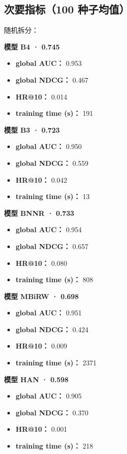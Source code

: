 \documentclass[
  10pt,
]{ctexart}
\providecommand{\tightlist}{%
  \setlength{\itemsep}{0pt}\setlength{\parskip}{0pt}}
\begin{document}
\subsection{次要指标（100
种子均值）}\label{ux6b21ux8981ux6307ux6807100-ux79cdux5b50ux5747ux503c}

随机拆分：

\textbf{模型 B4 · 0.745}

\begin{itemize}
\tightlist
\item
  \textbf{global AUC：} 0.953
\item
  \textbf{global NDCG：} 0.467
\item
  \textbf{HR@10：} 0.014
\item
  \textbf{training time (s)：} 191
\end{itemize}

\textbf{模型 B3 · 0.723}

\begin{itemize}
\tightlist
\item
  \textbf{global AUC：} 0.950
\item
  \textbf{global NDCG：} 0.559
\item
  \textbf{HR@10：} 0.042
\item
  \textbf{training time (s)：} 13
\end{itemize}

\textbf{模型 BNNR · 0.733}

\begin{itemize}
\tightlist
\item
  \textbf{global AUC：} 0.954
\item
  \textbf{global NDCG：} 0.657
\item
  \textbf{HR@10：} 0.080
\item
  \textbf{training time (s)：} 808
\end{itemize}

\textbf{模型 MBiRW · 0.698}

\begin{itemize}
\tightlist
\item
  \textbf{global AUC：} 0.951
\item
  \textbf{global NDCG：} 0.424
\item
  \textbf{HR@10：} 0.009
\item
  \textbf{training time (s)：} 2371
\end{itemize}

\textbf{模型 HAN · 0.598}

\begin{itemize}
\tightlist
\item
  \textbf{global AUC：} 0.905
\item
  \textbf{global NDCG：} 0.370
\item
  \textbf{HR@10：} 0.001
\item
  \textbf{training time (s)：} 218
\end{itemize}
\end{document}
